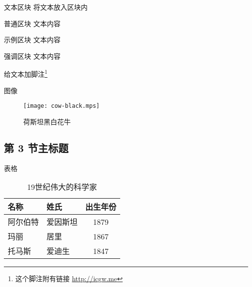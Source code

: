 \documentclass[]{beamer}
\begin{document}
\begin{frame}{文本区块}
	将文本放入区块内
	\begin{block}{普通区块}
		文本内容
	\end{block}
	\begin{exampleblock}{示例区块}
		文本内容
	\end{exampleblock}
	\begin{alertblock}{强调区块}
		文本内容
	\end{alertblock}
	给文本加脚注\footnote{这个脚注附有链接 \url{http://icgw.me}}
\end{frame}

\begin{frame}{图像}
	\begin{figure}
		\texttt{[image: cow-black.mps]}
		\caption{荷斯坦黑白花牛}
	\end{figure}
\end{frame}

\subsection[第 3 节缩写标题]{第 3 节主标题}

\begin{frame}{表格}
	\begin{table}
		\begin{tabular}{llc}
			名称     & 姓氏     & 出生年份 \\ \midrule
			阿尔伯特 & 爱因斯坦 & 1879     \\
			玛丽     & 居里     & 1867     \\
			托马斯   & 爱迪生   & 1847     \\
		\end{tabular}
		\caption{19世纪伟大的科学家}
	\end{table}
\end{frame}
\end{document}
